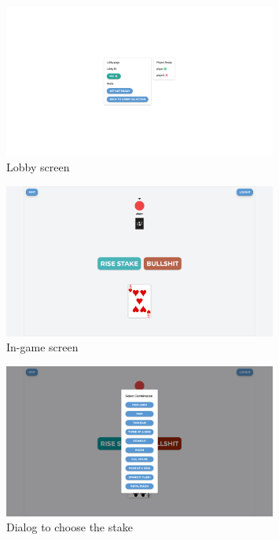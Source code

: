 \documentclass{scrartcl}
\begin{document}
\begin{figure}
      \centering
      \includegraphics[width=0.8\textwidth]{figures/lobbyScreenshot.png}
      \caption{Lobby screen}
      \label{fig:screenshot4}
\end{figure}

\begin{figure}
      \centering
      \includegraphics[width=0.8\textwidth]{figures/inGameScreenshot.png}
      \caption{In-game screen}
      \label{fig:screenshot5}
\end{figure}

\begin{figure}
      \centering
      \includegraphics[width=0.8\textwidth]{figures/chooseStakeDialogScreenshot.png}
      \caption{Dialog to choose the stake}
      \label{fig:screenshot6}
\end{figure}
\end{document}
